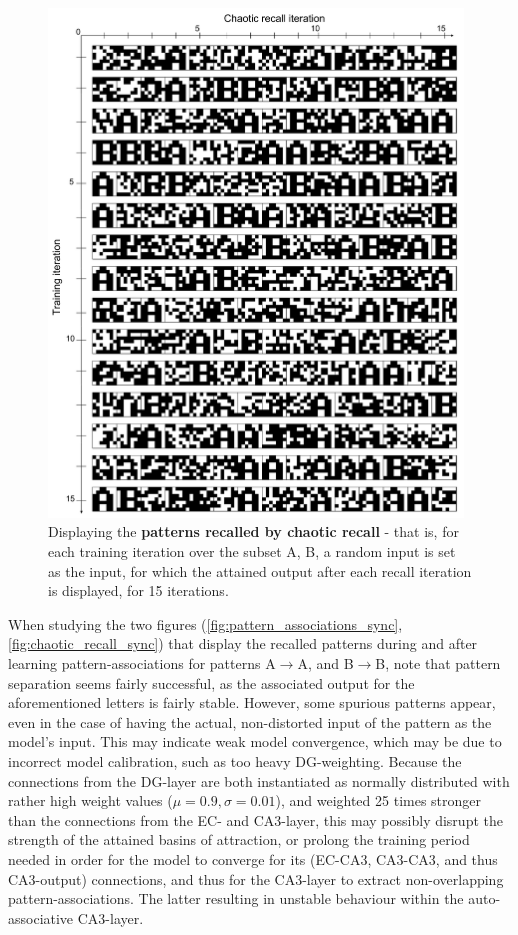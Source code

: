 \begin{figure}
    \centering
    \includegraphics[width=11cm]{fig/AB-chaotic-recall-sync-tm0-dgw25}
    \caption{Displaying the \textbf{patterns recalled by chaotic recall} - that is, for each training iteration over the subset {A, B}, a random input is set as the input, for which the attained output after each recall iteration is displayed, for 15 iterations.}
    \label{fig:low-level-2}
\end{figure}

When studying the two figures (\ref{fig:pattern_associations_sync}, \ref{fig:chaotic_recall_sync}) that display the recalled patterns during and after learning pattern-associations for patterns A$\rightarrow$A, and B$\rightarrow$B, note that pattern separation seems fairly successful, as the associated output for the aforementioned letters is fairly stable. However, some spurious patterns appear, even in the case of having the actual, non-distorted input of the pattern as the model's input. This may indicate weak model convergence, which may be due to incorrect model calibration, such as too heavy DG-weighting. Because the connections from the DG-layer are both instantiated as normally distributed with rather high weight values ($\mu=0.9, \sigma=0.01$), and weighted 25 times stronger than the connections from the EC- and CA3-layer, this may possibly disrupt the strength of the attained basins of attraction, or prolong the training period needed in order for the model to converge for its (EC-CA3, CA3-CA3, and thus CA3-output) connections, and thus for the CA3-layer to extract non-overlapping pattern-associations. The latter resulting in unstable behaviour within the auto-associative CA3-layer. 

